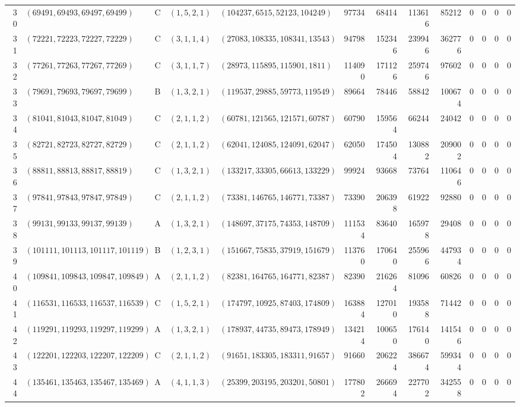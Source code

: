 \begin{longtable}{r l c l l r r r r c c c c}
30 & $(69491,69493,69497,69499)$ & C & $(1,5,2,1)$ & $(104237,6515,52123,104249)$ & 97734 & 68414 & 113616 & 85212 & 0 & 0 & 0 & 0\\
31 & $(72221,72223,72227,72229)$ & C & $(3,1,1,4)$ & $(27083,108335,108341,13543)$ & 94798 & 152346 & 239946 & 362776 & 0 & 0 & 0 & 0\\
32 & $(77261,77263,77267,77269)$ & C & $(3,1,1,7)$ & $(28973,115895,115901,1811)$ & 114090 & 171126 & 259746 & 97602 & 0 & 0 & 0 & 0\\
33 & $(79691,79693,79697,79699)$ & B & $(1,3,2,1)$ & $(119537,29885,59773,119549)$ & 89664 & 78446 & 58842 & 100674 & 0 & 0 & 0 & 0\\
34 & $(81041,81043,81047,81049)$ & C & $(2,1,1,2)$ & $(60781,121565,121571,60787)$ & 60790 & 159564 & 66244 & 24042 & 0 & 0 & 0 & 0\\
35 & $(82721,82723,82727,82729)$ & C & $(2,1,1,2)$ & $(62041,124085,124091,62047)$ & 62050 & 174504 & 130882 & 209002 & 0 & 0 & 0 & 0\\
36 & $(88811,88813,88817,88819)$ & C & $(1,3,2,1)$ & $(133217,33305,66613,133229)$ & 99924 & 93668 & 73764 & 110646 & 0 & 0 & 0 & 0\\
37 & $(97841,97843,97847,97849)$ & C & $(2,1,1,2)$ & $(73381,146765,146771,73387)$ & 73390 & 206398 & 61922 & 92880 & 0 & 0 & 0 & 0\\
38 & $(99131,99133,99137,99139)$ & A & $(1,3,2,1)$ & $(148697,37175,74353,148709)$ & 111534 & 83640 & 165978 & 29408 & 0 & 0 & 0 & 0\\
39 & $(101111,101113,101117,101119)$ & B & $(1,2,3,1)$ & $(151667,75835,37919,151679)$ & 113760 & 170640 & 255966 & 447934 & 0 & 0 & 0 & 0\\
40 & $(109841,109843,109847,109849)$ & A & $(2,1,1,2)$ & $(82381,164765,164771,82387)$ & 82390 & 216264 & 81096 & 60826 & 0 & 0 & 0 & 0\\
41 & $(116531,116533,116537,116539)$ & C & $(1,5,2,1)$ & $(174797,10925,87403,174809)$ & 163884 & 127010 & 193588 & 71442 & 0 & 0 & 0 & 0\\
42 & $(119291,119293,119297,119299)$ & A & $(1,3,2,1)$ & $(178937,44735,89473,178949)$ & 134214 & 100650 & 176140 & 141546 & 0 & 0 & 0 & 0\\
43 & $(122201,122203,122207,122209)$ & C & $(2,1,1,2)$ & $(91651,183305,183311,91657)$ & 91660 & 206224 & 386674 & 599344 & 0 & 0 & 0 & 0\\
44 & $(135461,135463,135467,135469)$ & A & $(4,1,1,3)$ & $(25399,203195,203201,50801)$ & 177802 & 266694 & 227702 & 342558 & 0 & 0 & 0 & 0\\

\end{longtable}
